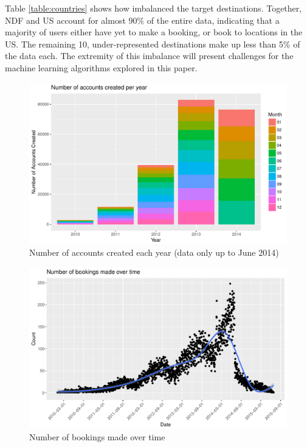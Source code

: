 \documentclass{article}
\begin{document}
Table \ref{table:countries} shows how imbalanced the target destinations. Together, NDF and US
account for almost 90\% of the entire data, indicating that a majority of users either 
have yet to make a booking, or book to locations in the US. The remaining 10, under-represented 
destinations make up less than 5\% of the data each. The extremity of this imbalance will present 
challenges for the machine learning algorithms explored in this paper.

\begin{figure}[!htbp]
  \includegraphics[scale = 0.6]{accountscreated.pdf}
  \caption{Number of accounts created each year (data only up to June 2014)}
  \label{fig:acct_created}
\end{figure}

\begin{figure}[!htbp]
  \includegraphics[scale=0.6]{bookingsovertime.pdf}
  \caption{Number of bookings made over time}
  \label{fig:bookings}
\end{figure}
\end{document}
